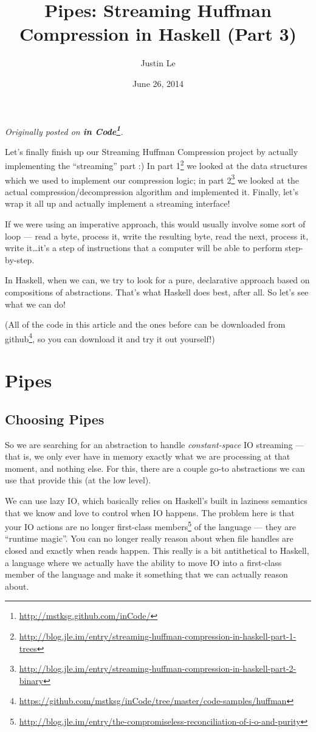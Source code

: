 \documentclass[]{article}
\title{Pipes: Streaming Huffman Compression in Haskell (Part 3)}
\author{Justin Le}
\date{June 26, 2014}
\renewcommand{\href}[2]{#2\footnote{\url{#1}}}
\begin{document}
\maketitle

\emph{Originally posted on
\textbf{\href{http://mstksg.github.com/inCode/}{in Code}}.}

Let's finally finish up our Streaming Huffman Compression project by
actually implementing the ``streaming'' part :) In
\href{http://blog.jle.im/entry/streaming-huffman-compression-in-haskell-part-1-trees}{part
1} we looked at the data structures which we used to implement our
compression logic; in
\href{http://blog.jle.im/entry/streaming-huffman-compression-in-haskell-part-2-binary}{part
2} we looked at the actual compression/decompression algorithm and
implemented it. Finally, let's wrap it all up and actually implement a
streaming interface!

If we were using an imperative approach, this would usually involve some
sort of loop --- read a byte, process it, write the resulting byte, read
the next, process it, write it\ldots{}it's a step of instructions that a
computer will be able to perform step-by-step.

In Haskell, when we can, we try to look for a pure, declarative approach
based on compositions of abstractions. That's what Haskell does best,
after all. So let's see what we can do!

(All of the code in this article and the ones before can be downloaded
\href{https://github.com/mstksg/inCode/tree/master/code-samples/huffman}{from
github}, so you can download it and try it out yourself!)

\section{Pipes}\label{pipes}

\subsection{Choosing Pipes}\label{choosing-pipes}

So we are searching for an abstraction to handle \emph{constant-space}
IO streaming --- that is, we only ever have in memory exactly what we
are processing at that moment, and nothing else. For this, there are a
couple go-to abstractions we can use that provide this (at the low
level).

We can use lazy IO, which basically relies on Haskell's built in
laziness semantics that we know and love to control when IO happens. The
problem here is that your IO actions are no longer
\href{http://blog.jle.im/entry/the-compromiseless-reconciliation-of-i-o-and-purity}{first-class
members} of the language --- they are ``runtime magic''. You can no
longer really reason about when file handles are closed and exactly when
reads happen. This really is a bit antithetical to Haskell, a language
where we actually have the ability to move IO into a first-class member
of the language and make it something that we can actually reason about.
\end{document}
